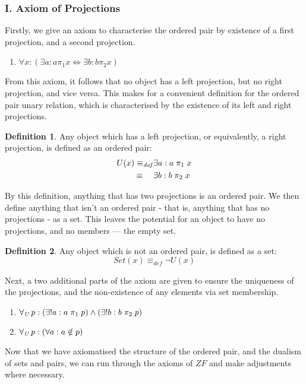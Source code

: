 \documentclass[11pt]{report}
\newcommand{\all}[1]{\forall_{\mathit{#1}}\hspace{0.5mm}}
\newcommand{\eqdef}{\equiv_\mathit{def}}
\newcommand{\pleft}{\mathrel{\pi_1}}
\newcommand{\pright}{\mathrel{\pi_2}}
\theoremstyle{definition}
\theoremstyle{theorem}
\theoremstyle{lemma}
\newtheorem{definition}{Definition}[section]
\begin{document}
\subsubsection*{I. Axiom of Projections}
Firstly, we give an axiom to characterise the ordered pair by existence of a first projection, and a second projection.
\begin{enumerate}[label=(\roman*)]
\item $\forall x: (\exists a: a\pleft x \Leftrightarrow \exists b: b\pright x)$
\end{enumerate}
From this axiom, it follows that no object has a left projection, but no right projection, and vice versa.
This makes for a convenient definition for the ordered pair unary relation, which is characterised by the existence of its left and right projections.

\begin{definition} Any object which has a left projection, or equivalently, a right projection, is defined as an ordered pair:
\begin{align*}
  U(x) \eqdef &\exists a: a\pleft x \\
       \equiv\hspace{4.5mm}&\exists b: b\pright x
\end{align*}
\end{definition}
\noindent
By this definition, anything that has two projections is an ordered pair. We then define anything that isn't an ordered pair - that is, anything that has no projections - as a set.
This leaves the potential for an object to have no projections, and no members --- the empty set.
\begin{definition} Any object which is not an ordered pair, is defined as a set:
$$\mathit{Set}(x) \eqdef \neg\mathit{U}(x)$$
\end{definition}
\noindent
Next, a two additional parts of the axiom are given to ensure the uniqueness of the projections, and the non-existence of any elements via set membership.
\begin{enumerate}[resume, label=(\roman*)]
  \item $\all{U} p: (\exists!a: a\pleft p) \wedge (\exists!b: b\pright p)$
  \item $\all{U} p: (\forall a: a\notin p)$
\end{enumerate}
Now that we have axiomatised the structure of the ordered pair, and the dualism of sets and pairs, we can run through the axioms of $\mathit{ZF}$ and make adjustments where necessary.
\end{document}
